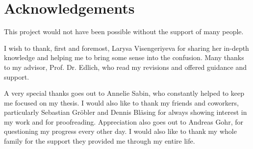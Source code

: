 \section*{Acknowledgements}
This project would not have been possible without the support of many people.

I wish to thank, first and foremost, Larysa Visengeriyeva for sharing her in-depth knowledge and helping me to bring some sense into the confusion. Many thanks to my advisor, Prof. Dr. Edlich, who read my revisions and offered guidance and support.

A very special thanks goes out to Annelie Sabin, who constantly helped to keep me focused on my thesis. I would also like to thank my friends and coworkers, particularly Sebastian Gröbler and Dennis Bläsing for always showing interest in my work and for proofreading. Appreciation also goes out to Andreas Gohr, for questioning my progress every other day. I would also like to thank my whole family for the support they provided me through my entire life.